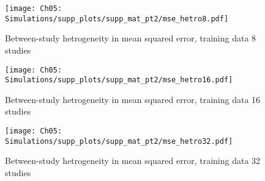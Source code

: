 \begin{figure}[H]
  \centering
  \texttt{[image: Ch05: Simulations/supp\_plots/supp\_mat\_pt2/mse\_hetro8.pdf]}
  \caption{Between-study hetrogeneity in mean squared error, training data 8 studies}
\end{figure}

\begin{figure}[H]
  \centering
  \texttt{[image: Ch05: Simulations/supp\_plots/supp\_mat\_pt2/mse\_hetro16.pdf]}
  \caption{Between-study hetrogeneity in mean squared error, training data 16 studies}
\end{figure}

\begin{figure}[H]
  \centering
  \texttt{[image: Ch05: Simulations/supp\_plots/supp\_mat\_pt2/mse\_hetro32.pdf]}
  \caption{Between-study hetrogeneity in mean squared error, training data 32 studies}
\end{figure}


